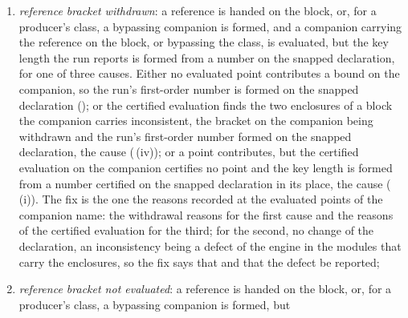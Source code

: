 \begin{requirement}
\begin{enumerate}[label=(\roman*),leftmargin=2.4em]
\begin{enumerate}[label=(\alph*),leftmargin=2.0em]
    because the declarer holds no reference of the family, because a
    reference fails the decisions of (i) or a property that (i) leaves to
    the constructing module is not established, or because the run declares
    that enclosed references are not used and a radius of the block is not
    zero; for a class of a producer's snap of its own emission, because the
    producer forms no companion that carries its exact construction past
    the snap, a \emph{bypassing companion}. The fix is a model of the family
    with a reference that the run uses, and for the last of the instance's
    causes an exact reference, or a run that uses enclosed references; for a
    producer's class, declared numbers on which its exact construction stays
    on the lattice, so that the class is kept;
  \item \emph{reference bracket withdrawn}: a reference is handed on the
    block, or, for a producer's class, a bypassing companion is formed, and
    a companion carrying the reference on the block, or bypassing the class,
    is evaluated, but the key length the run reports is formed from a number
    on the snapped declaration, for one of three causes. Either no evaluated
    point contributes a bound on the companion, so the run's first-order
    number is formed on the snapped declaration
    (); or the certified
    evaluation finds the two enclosures of a block the companion carries
    inconsistent, the bracket on the companion being withdrawn and the run's
    first-order number formed on the snapped declaration, the cause
    (\,(iv)); or a point
    contributes, but the certified evaluation on the companion certifies no
    point and the key length is formed from a number certified on the snapped
    declaration in its place, the cause 
    (\,(i)). The fix is
    the one the reasons recorded at the evaluated points of the companion
    name: the withdrawal reasons for the first cause and the reasons of the
    certified evaluation for the third; for the second, no change of the
    declaration, an inconsistency being a defect of the engine in the
    modules that carry the enclosures, so the fix says that and that the
    defect be reported;
  \item \emph{reference bracket not evaluated}: a reference is handed on the
    block, or, for a producer's class, a bypassing companion is formed, but

\end{enumerate}
\end{enumerate}
\end{requirement}
